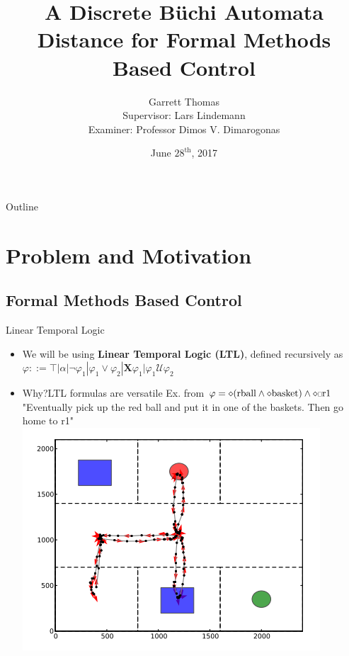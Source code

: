 \documentclass{beamer}
\title[B\"uchi Automata Distance]{A Discrete B\"uchi Automata Distance for Formal Methods Based Control}
\author[Garrett Thomas]{{\Large Garrett Thomas} \\
\small Supervisor: Lars Lindemann \\
Examiner: Professor Dimos V. Dimarogonas}
\institute[KTH] %
{
  Automatic Control Department \\
  Royal Institute of Technology, KTH}
\date{June $28^{\text{th}}$, 2017}
\newcommand{\ssquare}{\text{\scalebox{0.6}{$\square$}}}
\begin{document}
\begin{frame}
  \titlepage
\end{frame}

\begin{frame}{Outline}
  \tableofcontents
\end{frame}

\section{Problem and Motivation}

\subsection{Formal Methods Based Control}

\begin{frame}{Linear Temporal Logic}

  \begin{itemize}
  \item {
    We will be using \textbf{Linear Temporal Logic (LTL)}, defined recursively as
    $\varphi ::= \top | \alpha | \neg \varphi_1 | \varphi_1  \lor \varphi_2 | \textbf{X} \varphi_1 | \varphi_1 \bm{\mathcal{U}} \varphi_2$
    \pause
  }
  \item {
    Why?LTL formulas are versatile%
    Ex. from \cite{guo15} $ \varphi= \diamond(\text{rball} \land \diamond \text{basket}) \land \diamond \ssquare \text{r1}$ \\
    "Eventually pick up the red ball and put it in one of the baskets. Then go home to r1" \\
     \centering\includegraphics[scale=0.3]{ltlExampleWorkspace}\par
  }
  \end{itemize}
\end{frame}
\end{document}
